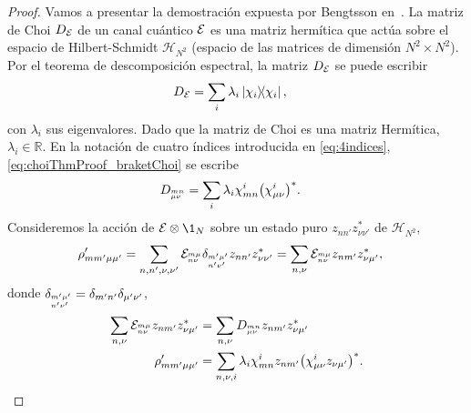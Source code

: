 \begin{proof}
Vamos a presentar la demostración expuesta por Bengtsson
en~\cite[p. 281]{bengtsson_zyczkowski_2017}.
La matriz de Choi $D_{\mathcal{E}}$ de un 
canal cuántico $\mathcal{E}$ es una matriz hermítica que 
actúa sobre el espacio de Hilbert-Schmidt $\mathcal{H}_{N^2}$
(espacio de las matrices de dimensión $N^2\times N^2$). 
Por el teorema de descomposición espectral, 
la matriz $D_{\mathcal{E}}$ se puede escribir~\cite{nielsen_chuang_2011}
\begin{align}\label{eq:choiThmProof_braketChoi}
D_{\E}&=\sum_{i}\lambda_i\dyad{\chi_i}{\chi_i},
\end{align}
con $\lambda_i$ sus eigenvalores. Dado que la matriz de Choi es una 
matriz Hermítica, $\lambda_i\in\mathbb{R}$. En la notación 
de cuatro índices introducida en \eqref{eq:4indices},
\eqref{eq:choiThmProof_braketChoi} se escribe
\begin{align}
D_{{{}^{mn}_{\mu\nu}}}&=\sum_i\lambda_i
\chi^i_{mn}\qty(\chi_{\mu\nu}^i)^*.
\end{align}
Consideremos la acción de $\E\ot \1_N$ sobre un 
estado puro $z_{nn'}z^*_{\nu\nu'}$ de $\mathcal{H}_{N^2}$,
\begin{align}
\rho'_{mm'\mu\mu'}&=
\sum_{n,n',\nu,\nu'}
\mathcal{E}_{{{}^{m\mu}_{n\nu}}}\delta_{{{}^{m'\mu'}_{n'	\nu'}}}z_{nn'}z^*_{\nu\nu'}
=
\sum_{n,\nu}
\mathcal{E}_{{{}^{m\mu}_{n\nu}}}z_{nm'}z^*_{\nu\mu'},
\end{align}
donde $\delta_{{{}^{m'\mu'}_{n'	\nu'}}}=\delta_{m'n'}\delta_{\mu'\nu'}$,
\begin{align}
\sum_{n,\nu}\mathcal{E}_{{{}^{m\mu}_{n\nu}}}z_{nm'}z^*_{\nu\mu'}&=
\sum_{n,\nu}D_{{{}^{mn}_{\mu\nu}}}z_{nm'}z^*_{\nu\mu'}\nonumber\\
\rho'_{mm'\mu\mu'}&=
\sum_{n,\nu,i}\lambda_{i}
\chi^i_{mn}z_{nm'}\qty(\chi_{\mu\nu}^iz_{\nu\mu'})^*.
\label{eq:rho'_ChoiThmProof}
\end{align}

\end{proof}
